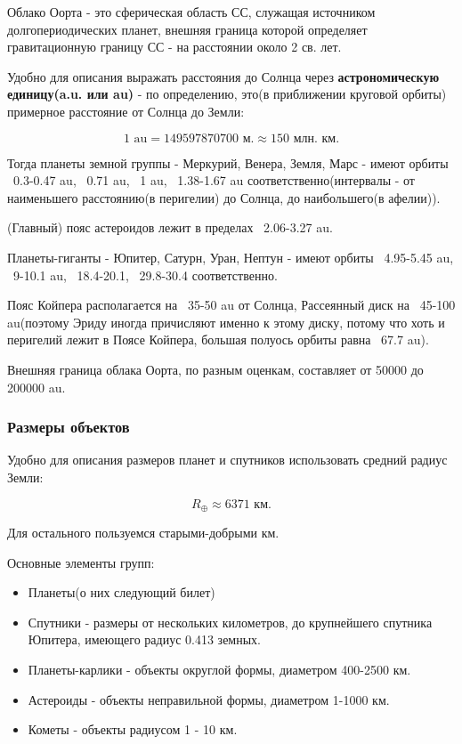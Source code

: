 Облако Оорта - это сферическая область СС, служащая источником долгопериодических планет, внешняя граница которой определяет гравитационную границу СС - на расстоянии около 2 св. лет.

Удобно для описания выражать расстояния до Солнца через \textbf{астрономическую единицу(a.u. или au)} - по определению, это(в приближении круговой орбиты) примерное расстояние от Солнца до Земли:

\begin{equation}
1 \text{ au} = 149 597 870 700 \text{ м.} \approx 150 \text{ млн. км.}
\label{eq:3_au}
\end{equation}

Тогда планеты земной группы - Меркурий, Венера, Земля, Марс - имеют орбиты ~0.3-0.47 au, ~0.71 au, ~1 au, ~1.38-1.67 au соответственно(интервалы - от наименьшего расстоянию(в перигелии) до Солнца, до наибольшего(в афелии)).

(Главный) пояс астероидов лежит в пределах ~2.06-3.27 au.

Планеты-гиганты - Юпитер, Сатурн, Уран, Нептун - имеют орбиты ~4.95-5.45 au, ~9-10.1 au, ~18.4-20.1, ~29.8-30.4 соответственно.

Пояс Койпера располагается на ~35-50 au от Солнца, Рассеянный диск на ~45-100 au(поэтому Эриду иногда причисляют именно к этому диску, потому что хоть и перигелий лежит в Поясе Койпера, большая полуось орбиты равна ~67.7 au).

Внешняя граница облака Оорта, по разным оценкам, составляет от 50000 до 200000 au.

\subsubsection{Размеры объектов}

Удобно для описания размеров планет и спутников использовать средний радиус Земли:

\begin{equation}
R_{\oplus} \approx 6371 \text{ км.}
\label{eq:3_r_earth}
\end{equation}

Для остального пользуемся старыми-добрыми км.

Основные элементы групп:

\begin{itemize}
	\item Планеты(о них следующий билет)
	\item Спутники - размеры от нескольких километров, до крупнейшего спутника Юпитера, имеющего радиус 0.413 земных.
	\item Планеты-карлики - объекты округлой формы, диаметром 400-2500 км.
	\item Астероиды - объекты неправильной формы, диаметром 1-1000 км.
	\item Кометы - объекты радиусом 1 - 10 км.
\end{itemize}

